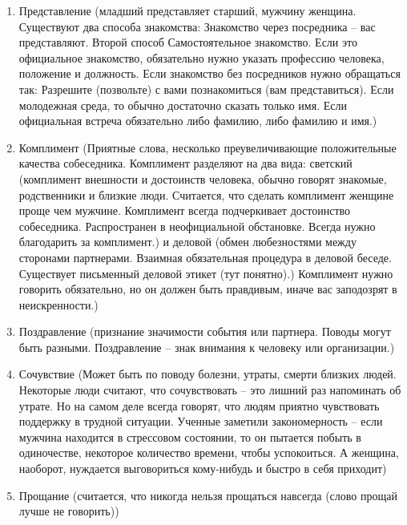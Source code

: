 \begin{enumerate}
\item Представление (младший представляет старший, мужчину женщина. Существуют два способа знакомства: Знакомство через посредника – вас представляют. Второй способ Самостоятельное знакомство. Если это официальное знакомство, обязательно нужно указать профессию человека, положение и должность. Если знакомство без посредников нужно обращаться так: Разрешите (позвольте) с вами познакомиться (вам представиться). Если молодежная среда, то обычно достаточно сказать только имя. Если официальная встреча обязательно либо фамилию, либо фамилию и имя.)
\item Комплимент (Приятные слова, несколько преувеличивающие положительные качества собеседника. Комплимент разделяют на два вида: светский (комплимент внешности и достоинств человека, обычно говорят знакомые, родственники и близкие люди. Считается, что сделать комплимент женщине проще чем мужчине. Комплимент всегда подчеркивает достоинство собеседника. Распространен в неофициальной обстановке. Всегда нужно благодарить за комплимент.) и деловой (обмен любезностями между сторонами партнерами. Взаимная обязательная процедура в деловой беседе. Существует письменный деловой этикет (тут понятно).) Комплимент нужно говорить обязательно, но он должен быть правдивым, иначе вас заподозрят в неискренности.)
\item Поздравление (признание значимости события или партнера. Поводы могут быть разными. Поздравление – знак внимания к человеку или организации.)
\item Сочувствие (Может быть по поводу болезни, утраты, смерти близких людей. Некоторые люди считают, что сочувствовать – это лишний раз напоминать об утрате. Но на самом деле всегда говорят, что людям приятно чувствовать поддержку в трудной ситуации. Ученные заметили закономерность – если мужчина находится в стрессовом состоянии, то он пытается побыть в одиночестве, некоторое количество времени, чтобы успокоиться. А женщина, наоборот, нуждается выговориться кому-нибудь и быстро в себя приходит)
\item Прощание (считается, что никогда нельзя прощаться навсегда (слово прощай лучше не говорить))

\end{enumerate}
